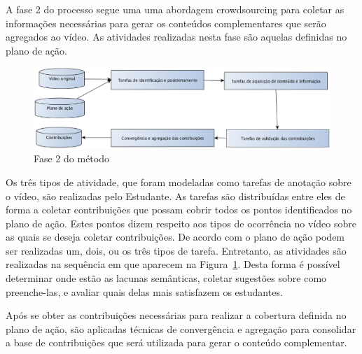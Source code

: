 A fase 2 do processo segue uma uma abordagem crowdsourcing para coletar as informações necessárias para gerar os conteúdos complementares que serão agregados ao vídeo. As atividades realizadas nesta fase são aquelas definidas no plano de ação.

\begin{figure}[ht]
\centering
\includegraphics[width=.99\textwidth]{imagens/metodo/fase2_oa.eps}
\caption{Fase 2 do método}
\label{fig:metodo:fase2}
\end{figure}

Os três tipos de atividade, que foram modeladas como tarefas de anotação sobre o vídeo, são realizadas pelo Estudante. As tarefas são distribuídas entre eles de forma a coletar contribuições que possam cobrir todos os pontos identificados no plano de ação. Estes pontos dizem respeito aos tipos de ocorrência no vídeo sobre as quais se deseja coletar contribuições. De acordo com o plano de ação podem ser realizadas um, dois, ou os três tipos de tarefa. Entretanto, as atividades são realizadas na sequência em que aparecem na Figura~\ref{fig:metodo:fase2}. Desta forma é possível determinar onde estão as lacunas semânticas, coletar sugestões sobre como preenche-las, e avaliar quais delas mais satisfazem os estudantes.

Após se obter as contribuições necessárias para realizar a cobertura definida no plano de ação, são aplicadas técnicas de convergência e agregação para consolidar a base de contribuições que será utilizada para gerar o conteúdo complementar.

